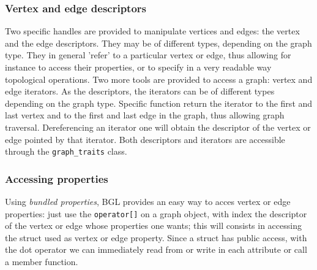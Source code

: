 \documentclass[11pt]{article} %
\newcommand{\classname}[1]{\texttt{#1}}
\begin{document}
		\subsubsection{Vertex and edge descriptors}
		Two specific handles are provided to manipulate vertices and edges: the vertex and the edge descriptors. They may be of different types, depending on the graph type. They in general 'refer' to a particular vertex or edge, thus allowing for instance to access their properties, or to specify in a very readable way topological operations. \newline
		Two more tools are provided to access a graph: vertex and edge iterators. As the descriptors, the iterators can be of different types depending on the graph type. Specific function return the iterator to the first and last vertex and to the first and last edge in the graph, thus allowing graph traversal. Dereferencing an iterator one will obtain the descriptor of the vertex or edge pointed by that iterator. \newline
		Both descriptors and iterators are accessible through the \classname{graph\_traits} class.
		
		\subsubsection{Accessing properties}
		Using \textit{bundled properties}, BGL provides an easy way to acces vertex or edge properties: just use the \texttt{operator[]} on a graph object, with index the descriptor of the vertex or edge whose properties one wants; this will consists in accessing the struct used as vertex or edge property. Since a struct has public access, with the dot operator we can immediately read from or write in each attribute or call a member function.
		
	
	
\end{document}
